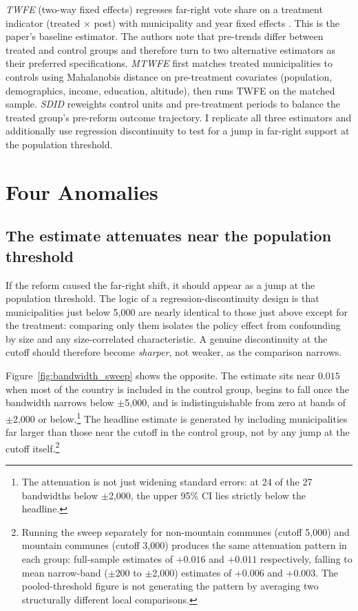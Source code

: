 \documentclass[12pt,letterpaper]{article}
\begin{document}
\textit{TWFE} (two-way fixed effects) regresses far-right vote share on a treatment indicator (treated $\times$ post) with municipality and year fixed effects \citep[see][for a recent overview of DID methods]{roth2023}. This is the paper's baseline estimator. The authors note that pre-trends differ between treated and control groups and therefore turn to two alternative estimators as their preferred specifications. \textit{MTWFE} \citep{ho2007} first matches treated municipalities to controls using Mahalanobis distance on pre-treatment covariates (population, demographics, income, education, altitude), then runs TWFE on the matched sample. \textit{SDID} \citep{arkhangelsky2021} reweights control units and pre-treatment periods to balance the treated group's pre-reform outcome trajectory. I replicate all three estimators and additionally use regression discontinuity \citep{calonico2014} to test for a jump in far-right support at the population threshold.

\section{Four Anomalies}
\label{sec:anomalies}

\subsection{The estimate attenuates near the population threshold}
\label{sec:attenuation}

If the reform caused the far-right shift, it should appear as a jump at the population threshold. The logic of a regression-discontinuity design is that municipalities just below 5,000 are nearly identical to those just above except for the treatment: comparing only them isolates the policy effect from confounding by size and any size-correlated characteristic. A genuine discontinuity at the cutoff should therefore become \textit{sharper}, not weaker, as the comparison narrows.

Figure~\ref{fig:bandwidth_sweep} shows the opposite. The estimate sits near $0.015$ when most of the country is included in the control group, begins to fall once the bandwidth narrows below $\pm$5{,}000, and is indistinguishable from zero at bands of $\pm$2{,}000 or below.\footnote{The attenuation is not just widening standard errors: at 24 of the 27 bandwidths below $\pm$2,000, the upper 95\% CI lies strictly below the headline.} The headline estimate is generated by including municipalities far larger than those near the cutoff in the control group, not by any jump at the cutoff itself.\footnote{Running the sweep separately for non-mountain communes (cutoff 5,000) and mountain communes (cutoff 3,000) produces the same attenuation pattern in each group: full-sample estimates of $+0.016$ and $+0.011$ respectively, falling to mean narrow-band ($\pm$200 to $\pm$2,000) estimates of $+0.006$ and $+0.003$. The pooled-threshold figure is not generating the pattern by averaging two structurally different local comparisons.}
\end{document}
